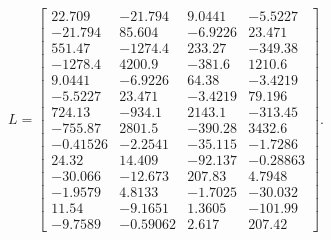{\small\[L=\begin{bmatrix}22.709 & -21.794 & 9.0441 & -5.5227\\
-21.794 & 85.604 & -6.9226 & 23.471\\
551.47 & -1274.4 & 233.27 & -349.38\\
-1278.4 & 4200.9 & -381.6 & 1210.6\\
9.0441 & -6.9226 & 64.38 & -3.4219\\
-5.5227 & 23.471 & -3.4219 & 79.196\\
724.13 & -934.1 & 2143.1 & -313.45\\
-755.87 & 2801.5 & -390.28 & 3432.6\\
-0.41526 & -2.2541 & -35.115 & -1.7286\\
24.32 & 14.409 & -92.137 & -0.28863\\
-30.066 & -12.673 & 207.83 & 4.7948\\
-1.9579 & 4.8133 & -1.7025 & -30.032\\
11.54 & -9.1651 & 1.3605 & -101.99\\
-9.7589 & -0.59062 & 2.617 & 207.42\end{bmatrix}.\]}

